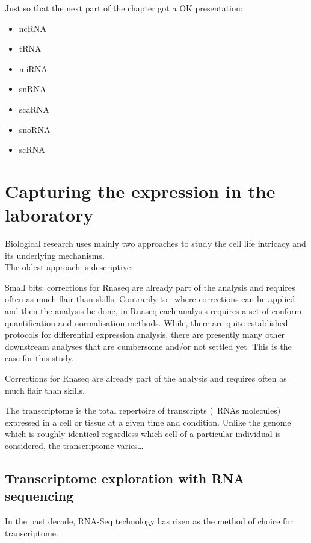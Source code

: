Just so that the next part of the chapter got a OK presentation:
\begin{itemize}
    \item \gls{ncRNA}
    \item \gls{tRNA}
    \item \gls{miRNA}
    \item \gls{snRNA}
    \item \gls{scaRNA}
    \item \gls{snoRNA}
    \item \gls{scRNA}
\end{itemize}



\section{Capturing the expression in the laboratory}

Biological research uses mainly two approaches to
study the cell life intricacy and its underlying mechanisms.\\
The oldest approach is descriptive:


Small bits: corrections for Rnaseq are already part of the analysis and
requires often as much flair than skills.
Contrarily to \Dnaseq\ where corrections can be applied  and
then the analysis be done, in Rnaseq each analysis requires a set of conform
quantification and normalisation methods.
While, there are quite established protocols for differential expression analysis,
there are presently many other downstream analyses that are cumbersome
and/or not settled yet. This is the case for this study.


Corrections for Rnaseq are already part of the analysis and
requires often as much flair than skills.

The transcriptome is the total repertoire of transcripts (\ie\ \glspl{RNA}
molecules) expressed in a cell or tissue at a given time and condition. Unlike
the genome which is roughly identical regardless which cell of a particular
individual is considered, the transcriptome varies\ldots

\subsection{Transcriptome exploration with RNA sequencing}

In the past decade, \gls{RNA-Seq} technology has risen as the method of choice
for  transcriptome.

